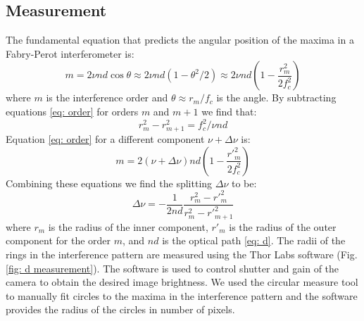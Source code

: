 \documentclass[11pt]{article}
\begin{document}
\subsection{Measurement} \label{sec: measuremet}
The fundamental equation that predicts the angular position of the maxima in a Fabry-Perot interferometer is:
\begin{equation}
    m = 2 \nu n d \cos{\theta} 
    \approx 2 \nu n d (1 - \theta^2/2)
    \approx 2 \nu n d (1 - \frac{r^2_m}{2f^2_c})
    \label{eq: order}
\end{equation}
where $m$ is the interference order and $\theta  \approx r_m/f_c$ is the angle. By subtracting equations \eqref{eq: order} for orders $m$ and $m + 1$ we find that: 
\begin{equation}
    r^2_m - r^2_{m+1} = f^2_c/\nu n d
\end{equation}
Equation \eqref{eq: order} for a different component $\nu + \Delta \nu$ is: 
\begin{equation}
    m = 2 (\nu + \Delta \nu) n d (1 - \frac{r'^2_m}{2f^2_c})
\end{equation}
Combining these equations we find the splitting $\Delta \nu$ to be: 
\begin{equation}
    \Delta \nu = - \frac{1}{2nd} \frac{r^2_m - r'^2_m}{r^2_m - r'^2_{m+1}}
    \label{eq: nu measurement}
\end{equation}
where $r_m$ is the radius of the inner component, $r'_m$ is the radius of the outer component for the order $m$, and $nd$ is the optical path \eqref{eq: d}. The radii of the rings in the interference pattern are measured using the Thor Labs software (Fig. \ref{fig: d measurement}). The software is used to control shutter and gain of the camera to obtain the desired image brightness. We used the circular measure tool to manually fit circles to the maxima in the interference pattern and the software provides the radius of the circles in number of pixels. 
\end{document}
